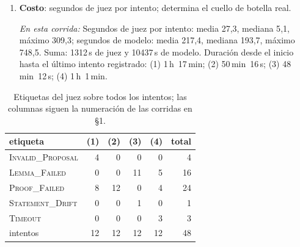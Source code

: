 \documentclass[11pt,a4paper]{article}
\begin{document}
\begin{enumerate}
  \emph{En esta corrida:} Tabla~\ref{tab:comparacion}. Los enunciados de $V_G$ y $V_I$ no coinciden, así que la comparación es indirecta.

  \item \textbf{Costo}: segundos de juez por intento; determina el cuello de botella real.

  \emph{En esta corrida:} Segundos de juez por intento: media 27{,}3, mediana 5{,}1, máximo 309{,}3; segundos de modelo: media 217{,}4, mediana 193{,}7, máximo 748{,}5. Suma: 1312\,s de juez y 10437\,s de modelo. Duración desde el inicio hasta el último intento registrado: (1) 1\,h~17\,min; (2) 50\,min~16\,s; (3) 48\,min~12\,s; (4) 1\,h~1\,min.

\end{enumerate}

\begin{table}[!ht]
\centering
\footnotesize
\setlength{\tabcolsep}{4pt}
\begin{tabular}{@{}lrrrrr@{}}
\toprule
etiqueta & (1) & (2) & (3) & (4) & total \\
\midrule
\textsc{Invalid\_Proposal} & 4 & 0 & 0 & 0 & 4 \\
\textsc{Lemma\_Failed} & 0 & 0 & 11 & 5 & 16 \\
\textsc{Proof\_Failed} & 8 & 12 & 0 & 4 & 24 \\
\textsc{Statement\_Drift} & 0 & 0 & 1 & 0 & 1 \\
\textsc{Timeout} & 0 & 0 & 0 & 3 & 3 \\
intentos & 12 & 12 & 12 & 12 & 48 \\
\bottomrule
\end{tabular}
\caption{Etiquetas del juez sobre todos los intentos; las columnas siguen la numeración de las corridas en §1.}
\label{tab:etiquetas}
\end{table}
\end{document}
